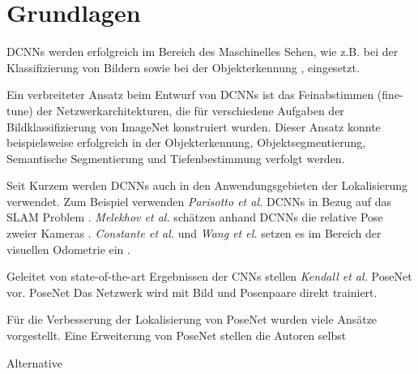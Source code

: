 \pagebreak
\section{Grundlagen}




\pagebreak
DCNNs werden erfolgreich im Bereich des Maschinelles Sehen, wie z.B. bei der Klassifizierung von Bildern \cite{krizhevskyImageNetClassificationDeep2012, simonyanVeryDeepConvolutional2014, heDeepResidualLearning2015} sowie bei der  Objekterkennung \cite{girshickRichFeatureHierarchies2013, renFasterRCNNRealTime2015b, girshickFastRCNN2015},  eingesetzt.

Ein verbreiteter Ansatz beim Entwurf von DCNNs ist das Feinabstimmen (fine-tune) der Netzwerkarchitekturen, die für verschiedene Aufgaben der Bildklassifizierung von ImageNet \cite{russakovskyImageNetLargeScale2014} konstruiert wurden. Dieser Ansatz konnte beispielsweise erfolgreich in der Objekterkennung, Objektsegmentierung, Semantische Segmentierung und Tiefenbestimmung verfolgt werden.

Seit Kurzem werden DCNNs auch in den Anwendungsgebieten der Lokalisierung verwendet. Zum Beispiel verwenden \textit{Parisotto et al.} DCNNs in Bezug auf das SLAM Problem \cite{parisottoGlobalPoseEstimation2018}. \textit{Melekhov et al.} schätzen anhand DCNNs die relative Pose zweier Kameras \cite{melekwashovRelativeCameraPose2017}. \textit{Constante et al.} und \textit{Wang et el.} setzen es im Bereich der visuellen Odometrie ein \cite{costanteExploringRepresentationLearning2016, wangDeepVOEndtoendVisual2017}.

Geleitet von state-of-the-art Ergebnissen der CNNs stellen \textit{Kendall et al.} PoseNet \cite{kendallPoseNetConvolutionalNetwork2015} vor.
PoseNet 
Das Netzwerk wird mit Bild und Posenpaare direkt trainiert.

Für die Verbesserung der Lokalisierung von PoseNet wurden viele Ansätze vorgestellt. Eine Erweiterung von PoseNet stellen die Autoren selbst


Alternative 



% 
